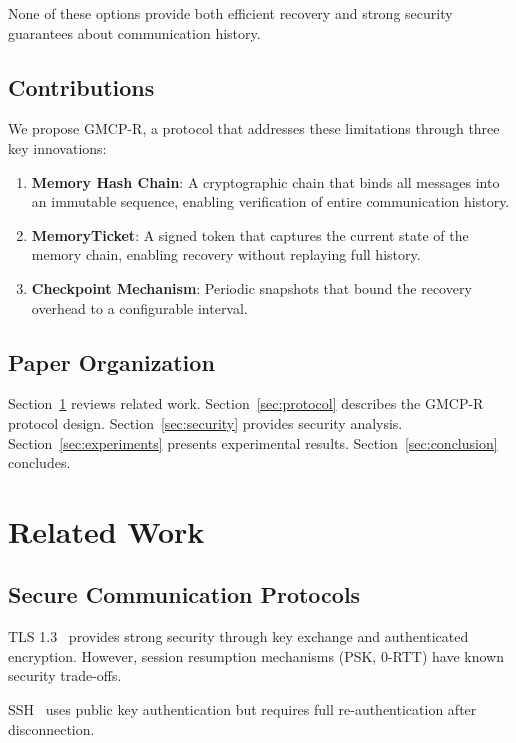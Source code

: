 \documentclass[conference]{IEEEtran}
\begin{document}
None of these options provide both efficient recovery and strong security guarantees about communication history.

\subsection{Contributions}

We propose GMCP-R, a protocol that addresses these limitations through three key innovations:

\begin{enumerate}
\item \textbf{Memory Hash Chain}: A cryptographic chain that binds all messages into an immutable sequence, enabling verification of entire communication history.

\item \textbf{MemoryTicket}: A signed token that captures the current state of the memory chain, enabling recovery without replaying full history.

\item \textbf{Checkpoint Mechanism}: Periodic snapshots that bound the recovery overhead to a configurable interval.
\end{enumerate}

\subsection{Paper Organization}

Section~\ref{sec:related} reviews related work. Section~\ref{sec:protocol} describes the GMCP-R protocol design. Section~\ref{sec:security} provides security analysis. Section~\ref{sec:experiments} presents experimental results. Section~\ref{sec:conclusion} concludes.

\section{Related Work}
\label{sec:related}

\subsection{Secure Communication Protocols}

TLS 1.3~\cite{tls13} provides strong security through key exchange and authenticated encryption. However, session resumption mechanisms (PSK, 0-RTT) have known security trade-offs.

SSH~\cite{ssh} uses public key authentication but requires full re-authentication after disconnection.
\end{document}

